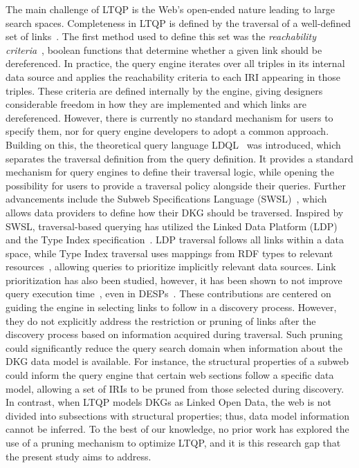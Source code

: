 The main challenge of LTQP is the Web's open-ended nature leading to large search spaces.
Completeness in LTQP is defined by the traversal of a well-defined set of links~\cite{Hartig2012}.
The first method used to define this set was the \emph{reachability criteria}~\cite{Hartig2012}, boolean functions that determine whether a given link should be dereferenced. 
In practice, the query engine iterates over all triples in its internal data source and applies the reachability criteria to each IRI appearing in those triples. 
These criteria are defined internally by the engine, giving designers considerable freedom in how they are implemented and which links are dereferenced. 
However, there is currently no standard mechanism for users to specify them, nor for query engine developers to adopt a common approach.
Building on this, the theoretical query language LDQL~\cite{hartigLDQL} was introduced, which separates the traversal definition from the query definition. 
It provides a standard mechanism for query engines to define their traversal logic, while opening the possibility for users to provide a traversal policy alongside their queries.
Further advancements include the Subweb Specifications Language (SWSL)~\cite{Bogaerts2021LinkTW}, which allows data providers to define how their DKG should be traversed.
Inspired by SWSL, traversal-based querying has utilized the Linked Data Platform (LDP) and the Type Index specification~\cite{Taelman2023}.  
LDP traversal follows all links within a data space, while Type Index traversal uses mappings from RDF types to relevant resources~\cite{solidTypeIndexes}, allowing queries to prioritize implicitly relevant data sources.
Link prioritization has also been studied, however, it has been shown to not improve query execution time~\cite{hartig2016walking}, even in DESPs~\cite{eschauzier_iswc_research_linkprioritization_2025}.
These contributions are centered on guiding the engine in selecting links to follow in a discovery process.
However, they do not explicitly address the restriction or pruning of links after the discovery process based on information acquired during traversal. 
Such pruning could significantly reduce the query search domain when information about the DKG data model is available. 
For instance, the structural properties of a subweb could inform the query engine that certain web sections follow a specific data model, allowing a set of IRIs to be pruned from those selected during discovery. 
In contrast, when LTQP models DKGs as Linked Open Data, the web is not divided into subsections with structural properties; thus, data model information cannot be inferred. 
To the best of our knowledge, no prior work has explored the use of a pruning mechanism to optimize LTQP, and it is this research gap that the present study aims to address.

